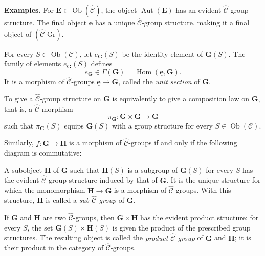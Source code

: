 \medskip
\noindent\textbf{Examples.}
For \(\mathbf E\in\operatorname{Ob}(\widehat{\mathscr C})\), the object
\(\underline{\operatorname{Aut}}(\mathbf E)\) has an evident
\(\widehat{\mathscr C}\)-group structure. The final object
\(\underline{\mathbf e}\) has a unique
\(\widehat{\mathscr C}\)-group structure, making it a final object of
\((\widehat{\mathscr C}\text{-}\mathrm{Gr})\).

For every \(S\in\operatorname{Ob}(\mathscr C)\), let
\(e_{\mathbf G}(S)\) be the identity element of \(\mathbf G(S)\). The family
of elements \(e_{\mathbf G}(S)\) defines
\[
  e_{\mathbf G}\in\Gamma(\mathbf G)
  =\operatorname{Hom}(\underline{\mathbf e},\mathbf G).
\]
It is a morphism of \(\widehat{\mathscr C}\)-groups
\(\underline{\mathbf e}\to\mathbf G\), called the \emph{unit section} of
\(\mathbf G\).

To give a \(\widehat{\mathscr C}\)-group structure on \(\mathbf G\) is
equivalently to give a composition law on \(\mathbf G\), that is, a
\(\widehat{\mathscr C}\)-morphism
\[
  \pi_{\mathbf G}:\mathbf G\times\mathbf G\longrightarrow\mathbf G
\]
such that \(\pi_{\mathbf G}(S)\) equips \(\mathbf G(S)\) with a group
structure for every \(S\in\operatorname{Ob}(\mathscr C)\).

Similarly, \(f:\mathbf G\to\mathbf H\) is a morphism of
\(\widehat{\mathscr C}\)-groups if and only if the following diagram is
commutative:

\begin{center}
  
\end{center}

A subobject \(\mathbf H\) of \(\mathbf G\) such that \(\mathbf H(S)\) is a
subgroup of \(\mathbf G(S)\) for every \(S\) has the evident
\(\widehat{\mathscr C}\)-group structure induced by that of \(\mathbf G\).
It is the unique structure for which the monomorphism
\(\mathbf H\to\mathbf G\) is a morphism of
\(\widehat{\mathscr C}\)-groups. With this structure, \(\mathbf H\) is
called a \emph{sub-\(\widehat{\mathscr C}\)-group} of \(\mathbf G\).

If \(\mathbf G\) and \(\mathbf H\) are two
\(\widehat{\mathscr C}\)-groups, then \(\mathbf G\times\mathbf H\) has the
evident product structure: for every \(S\), the set
\(\mathbf G(S)\times\mathbf H(S)\) is given the product of the prescribed
group structures. The resulting object is called the
\emph{product \(\widehat{\mathscr C}\)-group} of \(\mathbf G\) and
\(\mathbf H\); it is their product in the category of
\(\widehat{\mathscr C}\)-groups.

